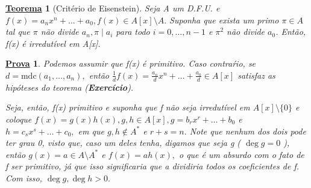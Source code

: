 \documentclass{article}
\newtheorem*{theorem*}{\underline{Teorema}}
\newtheorem*{proof*}{\underline{Prova}}
\begin{document}
    \begin{theorem*}[Critério de Eisenstein]
      Seja A um D.F.U. e \(f(x) = a_{n}x^{n} + \dotsc + a_{0}, f(x)\in A[x]\setminus{A}.\) Suponha que exista um primo \(\pi \in A\) tal que 
      \(\pi \) não divide \(a_{n}, \pi \mid a_{i}\) para todo \(i=0, \dotsc , n-1\) e \(\pi^{2}\) não divide \(a_{0}\). Então, f(x) é irredutível em 
      A[x].
    \end{theorem*}
    \begin{proof*}
      Podemos assumir que f(x) é primitivo. Caso contraŕio, se \(d = \mathrm{mdc}(a_{1}, \dotsc ,a_{n}),\) então
      \(\frac{1}{d}f(x) = \frac{a_{n}}{d}x^{n} + \dotsc + \frac{a_{0}}{d}\in A[x]\) satisfaz as hipóteses do teorema (\textbf{Exercício}).

      Seja, então, f(x) primitivo e suponha que f não seja irredutível em \(A[x]\setminus{\{0\}}\) e coloque
      \(f(x) = g(x)h(x), g, h\in A[x], g = b_{r}x^{r} + \dotsc  + b_{0}\) e \(h = c_{s}x^{s} + \dotsc +c_{0},\) em que
      \(g,h\not\in A^{*}\) e \(r+s = n.\) Note que nenhum dos dois pode ter grau 0, visto que, caso um deles tenha, digamos que seja g ( \(\deg{g} = 0\) ), então
      \(g(x)=a\in A\setminus{A^{*}}\) e \(f(x) = ah(x),\) o que é um absurdo com o fato de f ser primitivo, já que isso significaria que a dividiria todos os coeficientes
      de f. Com isso, \(\deg{g}, \deg{h} > 0.\)


\end{proof*}
\end{document}
